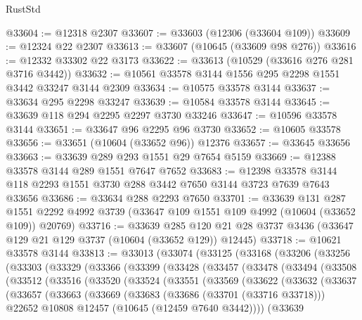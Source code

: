 \begin{lexlean}{RustStd}
\begin{coremodule}
@33604 := @12318 @2307
@33607 := @33603 (@12306 (@33604 @109))
@33609 := @12324 @22 @2307
@33613 := @33607 (@10645 (@33609 @98 @276))
@33616 := @12332 @33302 @22 @3173
@33622 := @33613 (@10529 (@33616 @276 @281 @3716 @3442))
@33632 := @10561 @33578 @3144 @1556 @295 @2298 @1551 @3442 @33247 @3144 @2309
@33634 := @10575 @33578 @3144
@33637 := @33634 @295 @2298 @33247
@33639 := @10584 @33578 @3144
@33645 := @33639 @118 @294 @2295 @2297 @3730 @33246
@33647 := @10596 @33578 @3144
@33651 := @33647 @96 @2295 @96 @3730
@33652 := @10605 @33578
@33656 := @33651 (@10604 (@33652 @96)) @12376
@33657 := @33645 @33656
@33663 := @33639 @289 @293 @1551 @29 @7654 @5159
@33669 := @12388 @33578 @3144 @289 @1551 @7647 @7652
@33683 := @12398 @33578 @3144 @118 @2293 @1551 @3730 @288 @3442 @7650 @3144 @3723 @7639 @7643 @33656
@33686 := @33634 @288 @2293 @7650
@33701 := @33639
    @131
    @287
    @1551
    @2292
    @4992
    @3739
    (@33647 @109 @1551 @109 @4992 (@10604 (@33652 @109)) @20769)
@33716 := @33639
    @285
    @120
    @21
    @28
    @3737
    @3436
    (@33647 @129 @21 @129 @3737 (@10604 (@33652 @129)) @12445)
@33718 := @10621 @33578 @3144
@33813 := @33013
    (@33074
      (@33125
        (@33168
          (@33206
            (@33256
              (@33303
                (@33329
                  (@33366
                    (@33399
                      (@33428
                        (@33457
                          (@33478
                            (@33494
                              (@33508
                                (@33512
                                  (@33516
                                    (@33520
                                      (@33524
                                        (@33551
                                          (@33569
                                            (@33622
                                              (@33632
                                                (@33637
                                                  (@33657
                                                    (@33663
                                                      (@33669
                                                        (@33683
                                                          (@33686 (@33701 (@33716 @33718)))
                                                          @22652
                                                          @10808
                                                          @12457
                                                          (@10645 (@12459 @7640 @3442))))
                                                      (@33639

\end{coremodule}
\end{lexlean}
